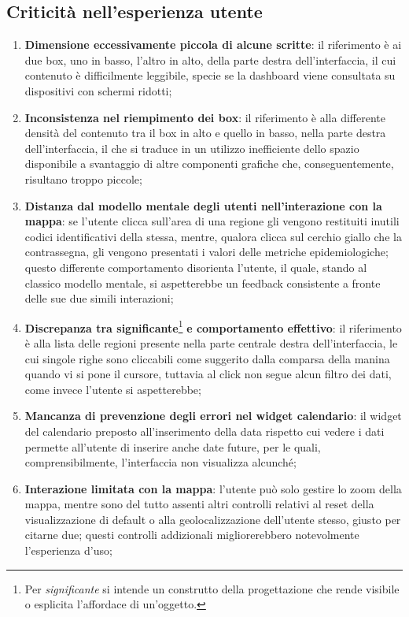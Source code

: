 \documentclass[../../main.tex]{subfiles}
\begin{document}
\subsection{Criticità nell'esperienza utente}\label{ss:criticita}
\begin{enumerate}
    \item \textbf{Dimensione eccessivamente piccola di alcune scritte}: il riferimento è ai due box, uno in basso, l'altro in alto, della parte destra dell'interfaccia, il cui contenuto è difficilmente leggibile, specie se la dashboard viene consultata su dispositivi con schermi ridotti; \label{el:1}
    \item \textbf{Inconsistenza nel riempimento dei box}: il riferimento è alla differente densità del contenuto tra il box in alto e quello in basso, nella parte destra dell'interfaccia, il che si traduce in un utilizzo inefficiente dello spazio disponibile a svantaggio di altre componenti grafiche che, conseguentemente, risultano troppo piccole;\label{el:2}
    \item \textbf{Distanza dal modello mentale degli utenti nell'interazione con la mappa}: se l'utente clicca sull'area di una regione gli vengono restituiti inutili codici identificativi della stessa, mentre, qualora clicca sul cerchio giallo che la contrassegna, gli vengono presentati i valori delle metriche epidemiologiche; questo differente comportamento disorienta l'utente, il quale, stando al classico modello mentale, si aspetterebbe un feedback consistente a fronte delle sue due simili interazioni;\label{el:3}
    \item \textbf{Discrepanza tra significante}\footnote{Per \textit{significante} si intende un construtto della progettazione che rende visibile o esplicita l'affordace di un'oggetto.}  \textbf{e comportamento effettivo}: il riferimento è alla lista delle regioni presente nella parte centrale destra dell'interfaccia, le cui singole righe sono cliccabili come suggerito dalla comparsa della manina quando vi si pone il cursore, tuttavia al click non segue alcun filtro dei dati, come invece l'utente si aspetterebbe;\label{el:4}
    \item \textbf{Mancanza di prevenzione degli errori nel widget calendario}: il widget del calendario preposto all'inserimento della data rispetto cui vedere i dati permette all'utente di inserire anche date future, per le quali, comprensibilmente, l'interfaccia non visualizza alcunché;\label{el:5}
    \item \textbf{Interazione limitata con la mappa}: l'utente può solo gestire lo zoom della mappa, mentre sono del tutto assenti altri controlli relativi al reset della visualizzazione di default o alla geolocalizzazione dell'utente stesso, giusto per citarne due; questi controlli addizionali migliorerebbero notevolmente l'esperienza d'uso;\label{el:6}

\end{enumerate}
\end{document}
